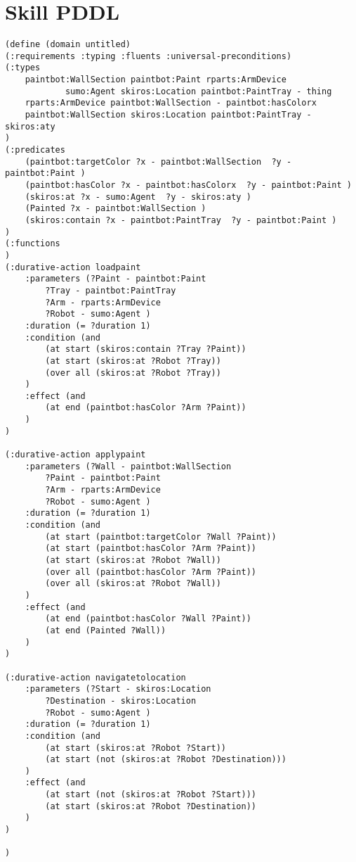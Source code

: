 \appendix

\section{Skill PDDL} \label{app:skill_pddl}
\begin{verbatim}
(define (domain untitled)
(:requirements :typing :fluents :universal-preconditions)
(:types 
    paintbot:WallSection paintbot:Paint rparts:ArmDevice
            sumo:Agent skiros:Location paintbot:PaintTray - thing
    rparts:ArmDevice paintbot:WallSection - paintbot:hasColorx
    paintbot:WallSection skiros:Location paintbot:PaintTray - skiros:aty
)
(:predicates 
    (paintbot:targetColor ?x - paintbot:WallSection  ?y - paintbot:Paint )
    (paintbot:hasColor ?x - paintbot:hasColorx  ?y - paintbot:Paint )
    (skiros:at ?x - sumo:Agent  ?y - skiros:aty )
    (Painted ?x - paintbot:WallSection )
    (skiros:contain ?x - paintbot:PaintTray  ?y - paintbot:Paint )
)
(:functions
)
(:durative-action loadpaint
    :parameters (?Paint - paintbot:Paint
        ?Tray - paintbot:PaintTray
        ?Arm - rparts:ArmDevice
        ?Robot - sumo:Agent )
    :duration (= ?duration 1)
    :condition (and
        (at start (skiros:contain ?Tray ?Paint))
        (at start (skiros:at ?Robot ?Tray))
        (over all (skiros:at ?Robot ?Tray))
    )
    :effect (and
        (at end (paintbot:hasColor ?Arm ?Paint))
    )
)

(:durative-action applypaint
    :parameters (?Wall - paintbot:WallSection
        ?Paint - paintbot:Paint
        ?Arm - rparts:ArmDevice
        ?Robot - sumo:Agent )
    :duration (= ?duration 1)
    :condition (and
        (at start (paintbot:targetColor ?Wall ?Paint))
        (at start (paintbot:hasColor ?Arm ?Paint))
        (at start (skiros:at ?Robot ?Wall))
        (over all (paintbot:hasColor ?Arm ?Paint))
        (over all (skiros:at ?Robot ?Wall))
    )
    :effect (and
        (at end (paintbot:hasColor ?Wall ?Paint))
        (at end (Painted ?Wall))
    )
)

(:durative-action navigatetolocation
    :parameters (?Start - skiros:Location
        ?Destination - skiros:Location
        ?Robot - sumo:Agent )
    :duration (= ?duration 1)
    :condition (and
        (at start (skiros:at ?Robot ?Start))
        (at start (not (skiros:at ?Robot ?Destination)))
    )
    :effect (and
        (at start (not (skiros:at ?Robot ?Start)))
        (at start (skiros:at ?Robot ?Destination))
    )
)

)
\end{verbatim}